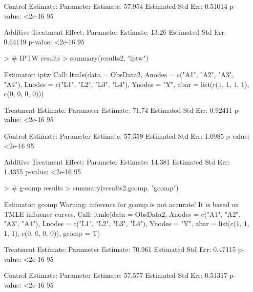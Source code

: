 \documentclass{exam}
\begin{document}
\begin{solution}
\begin{Schunk}
\begin{Soutput}
Control Estimate:
   Parameter Estimate:  57.954 
    Estimated Std Err:  0.51014 
              p-value:  <2e-16 
    95%

Additive Treatment Effect:
   Parameter Estimate:  13.26 
    Estimated Std Err:  0.64119 
              p-value:  <2e-16 
    95%
\end{Soutput}
\end{Schunk}
\begin{Schunk}
\begin{Sinput}
> # IPTW results
> summary(results2, "iptw")
\end{Sinput}
\begin{Soutput}
Estimator:  iptw 
Call:
ltmle(data = ObsData2, Anodes = c("A1", "A2", "A3", "A4"), Lnodes = c("L1", 
    "L2", "L3", "L4"), Ynodes = "Y", abar = list(c(1, 1, 1, 1), 
    c(0, 0, 0, 0)))

Treatment Estimate:
   Parameter Estimate:  71.74 
    Estimated Std Err:  0.92411 
              p-value:  <2e-16 
    95%

Control Estimate:
   Parameter Estimate:  57.359 
    Estimated Std Err:  1.0985 
              p-value:  <2e-16 
    95%

Additive Treatment Effect:
   Parameter Estimate:  14.381 
    Estimated Std Err:  1.4355 
              p-value:  <2e-16 
    95%
\end{Soutput}
\end{Schunk}
\begin{Schunk}
\begin{Sinput}
> # g-comp results
> summary(results2.gcomp, "gcomp")
\end{Sinput}
\begin{Soutput}
Estimator:  gcomp 
Warning: inference for gcomp is not accurate! It is based on TMLE influence curves.
Call:
ltmle(data = ObsData2, Anodes = c("A1", "A2", "A3", "A4"), Lnodes = c("L1", 
    "L2", "L3", "L4"), Ynodes = "Y", abar = list(c(1, 1, 1, 1), 
    c(0, 0, 0, 0)), gcomp = T)

Treatment Estimate:
   Parameter Estimate:  70.961 
    Estimated Std Err:  0.47115 
              p-value:  <2e-16 
    95%

Control Estimate:
   Parameter Estimate:  57.577 
    Estimated Std Err:  0.51317 
              p-value:  <2e-16 
    95%


\end{Soutput}
\end{Schunk}
\end{solution}
\end{document}
